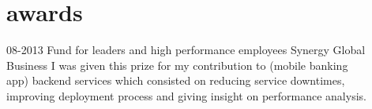 \documentclass[]{friggeri-cv}
\begin{document}
\section{awards}

\begin{entrylist}
  \entry
    {\small 08-2013}
    {Fund for leaders and high performance employees}
    {Synergy Global Business}
    {I was given this prize for my contribution to  (mobile banking\\
     app) backend services which consisted on reducing service downtimes,\\
     improving deployment process and giving insight on performance analysis.}
\end{entrylist}
\end{document}
